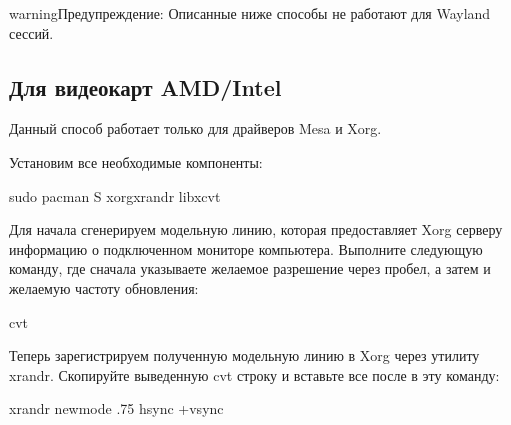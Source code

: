 \documentclass[letterpaper,10pt,russian,openany]{sphinxmanual}
\begin{document}
\begin{sphinxadmonition}{warning}{Предупреждение:}
\sphinxAtStartPar
Описанные ниже способы не работают для Wayland сессий.
\end{sphinxadmonition}

\ignorespaces 

\subsection{Для видеокарт AMD/Intel}
\label{\detokenize{source/first-steps:amd-intel}}\label{\detokenize{source/first-steps:monitor-overlocking-mesa}}\label{\detokenize{source/first-steps:index-17}}
\sphinxAtStartPar
Данный способ работает только для драйверов Mesa и Xorg.

\sphinxAtStartPar
Установим все необходимые компоненты:

\begin{sphinxVerbatim}[commandchars=\\\{\}]
sudo pacman \PYGZhy{}S xorg\PYGZhy{}xrandr libxcvt
\end{sphinxVerbatim}

\sphinxAtStartPar
Для начала сгенерируем модельную линию, которая предоставляет Xorg серверу информацию о подключенном мониторе компьютера.
Выполните следующую команду, где сначала указываете желаемое разрешение через пробел, а затем и желаемую частоту обновления:

\begin{sphinxVerbatim}[commandchars=\\\{\}]
cvt   
\end{sphinxVerbatim}

\sphinxAtStartPar
Теперь зарегистрируем полученную модельную линию в Xorg через утилиту xrandr.
Скопируйте выведенную cvt строку и вставьте все после  в эту команду:

\begin{sphinxVerbatim}[commandchars=\\\{\}]
xrandr \PYGZhy{}\PYGZhy{}newmode   .75           \PYGZhy{}hsync +vsync
\end{sphinxVerbatim}
\end{document}
